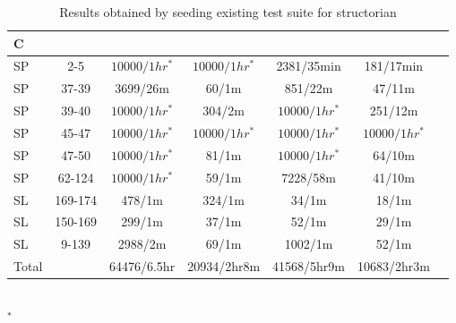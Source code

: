 \begin{table}
\begin{CodeOut}
\begin{center}
\begin{tiny}
\caption {\label{table:rq5}\scriptsize{Results obtained by seeding existing test suite for structorian}}
\begin {tabular} {|l|c|c|c|c|c|c|}
\hline
C & \CenterCell{V} &\CenterCell{$N_{Pex}/T$}&\CenterCell{$Np_{seed}/T$} &\CenterCell{$N_{eXpress}/T$} &\CenterCell{$Ne_{seed}$/T}\\

\hline
SP&2-5&$10000/1hr^*$&$10000/1hr^*$&2381/35min&181/17min\\
\hline
SP&37-39		&3699/26m			&60/1m			&851/22m				&47/11m\\
\hline
SP&39-40		&$10000/1hr^*$	&304/2m			&$10000/1hr^*$		&251/12m\\
\hline
SP&45-47&		$10000/1hr^*$		&$10000/1hr^*$&$10000/1hr^*$		&$10000/1hr^*$\\
\hline
SP&47-50&		$10000/1hr^*$		&81/1m			&$10000/1hr^*$		&64/10m\\
\hline
SP&62-124&	$10000/1hr^*$		&59/1m			&7228/58m				&41/10m\\
\hline
SL&169-174	&478/1m				&324/1m			&34/1m					&18/1m\\
\hline
SL&150-169	&299/1m				&37/1m			&52/1m					&29/1m\\
\hline
SL&9-139		&2988/2m			&69/1m			&1002/1m				&52/1m\\
\hline
Total&			&64476/6.5hr		&20934/2hr8m				&41568/5hr9m					&10683/2hr3m\\
\hline
\end{tabular}\\
$^*$ 
\end{tiny}
\end{center}
\end{CodeOut}
\vspace{- 0.4 in}
\end{table}


